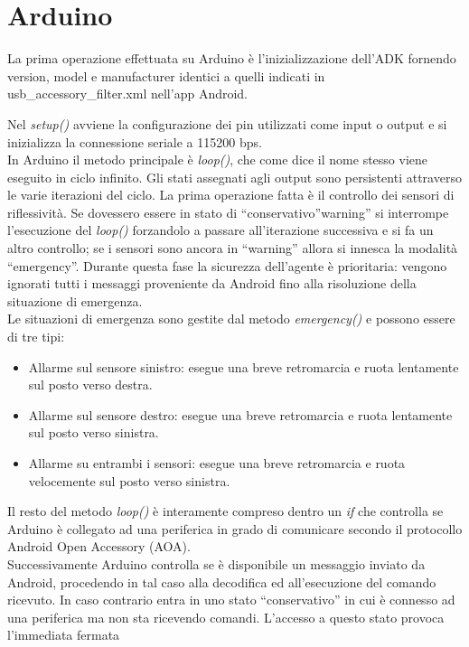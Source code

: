 \section {Arduino} 
La prima operazione effettuata su Arduino è l'inizializzazione dell'ADK fornendo 
version, model e manufacturer identici a quelli indicati in usb\_accessory\_filter.xml 
nell'app Android.

Nel \emph{setup()} avviene la configurazione dei pin utilizzati come input o output e si inizializza
la connessione seriale a 115200 bps.\\
In Arduino il metodo principale è \emph{loop()}, che come dice il nome stesso viene eseguito
in ciclo infinito. Gli stati assegnati agli output sono persistenti attraverso 
le varie iterazioni del ciclo.
La prima operazione fatta è il controllo dei sensori di riflessività. Se dovessero 
essere in stato di ``conservativo''warning'' si interrompe l'esecuzione del \emph{loop()} 
forzandolo a passare all'iterazione successiva e si fa un altro controllo; se i 
sensori sono ancora in ``warning'' allora si innesca la modalità ``emergency''.
Durante questa fase la sicurezza dell'agente è prioritaria: vengono ignorati tutti 
i messaggi proveniente da Android fino alla risoluzione della situazione di emergenza.\\
Le situazioni di emergenza sono gestite dal metodo \emph{emergency()} e possono 
essere di tre tipi:
\begin{itemize}
	\item Allarme sul sensore sinistro: esegue una breve retromarcia 
	e ruota lentamente sul posto verso destra.
	\item Allarme sul sensore destro: esegue una breve retromarcia 
	e ruota lentamente sul posto verso sinistra.
	\item Allarme su entrambi i sensori: esegue una breve retromarcia 
	e ruota velocemente sul posto verso sinistra.
\end{itemize}
Il resto del metodo \emph{loop()} è interamente compreso dentro un
\emph{if} che controlla se Arduino è collegato ad una periferica in grado di 
comunicare secondo il protocollo Android Open Accessory (AOA).\\
Successivamente Arduino controlla se è disponibile un messaggio inviato da Android, 
procedendo in tal caso alla de\emph{}codifica ed all'esecuzione del comando ricevuto. 
In caso contrario entra in uno stato ``conservativo'' in cui è connesso ad una periferica 
ma non sta ricevendo comandi. L'accesso a questo stato provoca l'immediata fermata 
